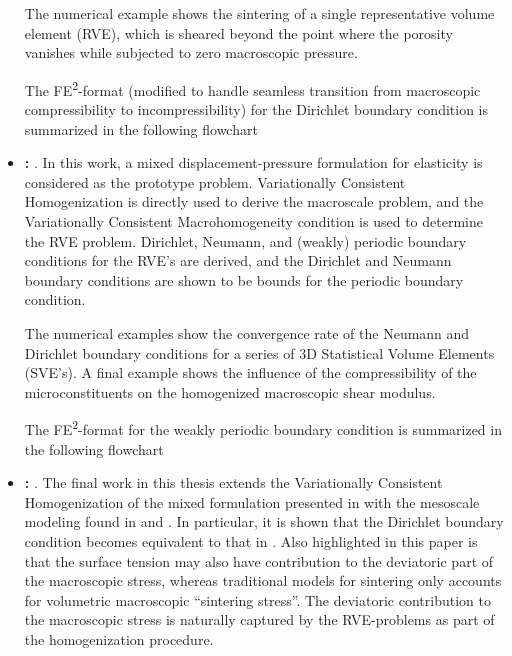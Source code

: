 \documentclass[MikaelDissertation.tex]{subfiles}
\begin{document}
\begin{itemize}
The numerical example shows the sintering of a single representative volume element (RVE), which is sheared beyond the point where the porosity vanishes while subjected to zero macroscopic pressure.

The FE\textsuperscript{2}-format (modified to handle seamless transition from macroscopic compressibility to incompressibility) for the Dirichlet boundary condition is summarized in the following flowchart
\begin{center}
  
\end{center}


 \item \textbf{: }.
In this work, a mixed displacement-pressure formulation for elasticity is considered as the prototype problem.
Variationally Consistent Homogenization is directly used to derive the macroscale problem, and the Variationally Consistent Macrohomogeneity condition is used to determine the RVE problem.
Dirichlet, Neumann, and (weakly) periodic boundary conditions for the RVE's are derived, and the Dirichlet and Neumann boundary conditions are shown to be bounds for the periodic boundary condition.

The numerical examples show the convergence rate of the Neumann and Dirichlet boundary conditions for a series of 3D Statistical Volume Elements (SVE's).
A final example shows the influence of the compressibility of the microconstituents on the homogenized macroscopic shear modulus.


The FE\textsuperscript{2}-format for the weakly periodic boundary condition is summarized in the following flowchart
\begin{center}
  
\end{center}


 \item \textbf{: }.
The final work in this thesis extends the Variationally Consistent Homogenization of the mixed formulation presented in  with the mesoscale modeling found in  and .
In particular, it is shown that the Dirichlet boundary condition becomes equivalent to that in .
Also highlighted in this paper is that the surface tension may also have contribution to the deviatoric part of the macroscopic stress, whereas traditional models for sintering only accounts for volumetric macroscopic ``sintering stress''.
The deviatoric contribution to the macroscopic stress is naturally captured by the RVE-problems as part of the homogenization procedure.


\end{itemize}
\end{document}
